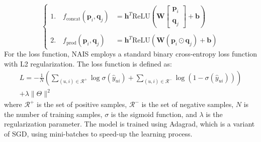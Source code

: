 \documentclass{ieeetj}
\begin{document}
\begin{equation*}
	\left\{
	\begin{aligned}
	1.\quad f_{\text{concat}}(\mathbf{p}_i, \mathbf{q}_j) &= \mathbf{h}^T \text{ReLU} \left( \mathbf{W} \begin{bmatrix} \mathbf{p}_i \\\\ \mathbf{q}_j \end{bmatrix} + \mathbf{b} \right) \\\\
	2.\quad f_{\text{prod}}(\mathbf{p}_i, \mathbf{q}_j) &= \mathbf{h}^T \text{ReLU} \left( \mathbf{W} (\mathbf{p}_i \odot \mathbf{q}_j) + \mathbf{b} \right)
	\end{aligned}
	\right.
\end{equation*}
For the loss function, NAIS employs a standard binary cross-entropy loss function with L2 regularization. The loss function is defined as:
\[
\begin{align}
		L = -\frac{1}{N} \left( 
		\sum_{(u,i) \in \mathcal{R}^+} \log \sigma(\hat{y}_{ui}) 
		+ \sum_{(u,i) \in \mathcal{R}^-} \log (1 - \sigma(\hat{y}_{ui})) 
		\right) \\ + \lambda \| \Theta \|^2		
\end{align}
\]
where $\mathcal{R}^+$ is the set of positive samples, $\mathcal{R}^-$ is the set of negative samples, $N$ is the number of training samples, $\sigma$ is the sigmoid function, and $\lambda$ is the regularization parameter. The model is trained using Adagrad, which is a variant of SGD, using mini-batches to speed-up the learning process. 
\end{document}
